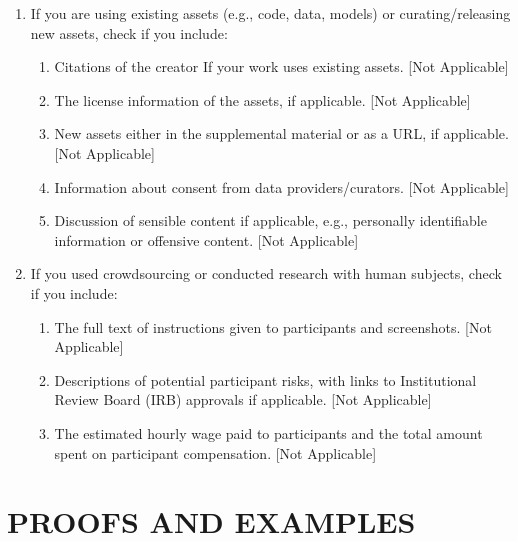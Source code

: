 \documentclass[twoside]{article}
\theoremstyle{definition}
\theoremstyle{remark}
\begin{document}
\begin{enumerate}
  \item If you are using existing assets (e.g., code, data, models) or curating/releasing new assets, check if you include:
  \begin{enumerate}
    \item Citations of the creator If your work uses existing assets. [Not Applicable]
    \item The license information of the assets, if applicable. [Not Applicable]
    \item New assets either in the supplemental material or as a URL, if applicable. [Not Applicable]
    \item Information about consent from data providers/curators. [Not Applicable]
    \item Discussion of sensible content if applicable, e.g., personally identifiable information or offensive content. [Not Applicable]
  \end{enumerate}

  \item If you used crowdsourcing or conducted research with human subjects, check if you include:
  \begin{enumerate}
    \item The full text of instructions given to participants and screenshots. [Not Applicable]
    \item Descriptions of potential participant risks, with links to Institutional Review Board (IRB) approvals if applicable. [Not Applicable]
    \item The estimated hourly wage paid to participants and the total amount spent on participant compensation. [Not Applicable]
  \end{enumerate}

\end{enumerate}













\onecolumn
{}





\section{PROOFS AND EXAMPLES}
\end{document}
